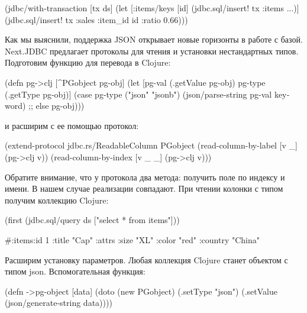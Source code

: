 \begin{english}
  \begin{clojure}
(jdbc/with-transaction [tx ds]
  (let [{:items/keys [id]}
        (jdbc.sql/insert! tx :items {...})]
    (jdbc.sql/insert! tx :sales {:item_id id :ratio 0.66})))
  \end{clojure}
\end{english}

Как мы выяснили, поддержка JSON открывает новые горизонты в работе с базой. Next.JDBC предлагает протоколы для чтения и установки нестандартных типов. Подготовим функцию для перевода  в Clojure:

\begin{english}
  \begin{clojure}
(defn pg->clj [^PGobject pg-obj]
  (let [pg-val (.getValue pg-obj)
        pg-type (.getType pg-obj)]
    (case pg-type
      ("json" "jsonb")
      (json/parse-string pg-val keyword)
      ;; else
      pg-obj)))
  \end{clojure}
\end{english}

и расширим с ее помощью протокол:

\begin{english}
  \begin{clojure}
(extend-protocol jdbc.rs/ReadableColumn
  PGobject
  (read-column-by-label [v _]
    (pg->clj v))
  (read-column-by-index [v _ _]
    (pg->clj v)))
  \end{clojure}
\end{english}

Обратите внимание, что у протокола два метода: получить поле по индексу и имени. В нашем случае реализации совпадают. При чтении колонки с типом  получим коллекцию Clojure:

\begin{english}
  \begin{clojure}
(first (jdbc.sql/query ds ["select * from items"]))

#:items{:id 1
        :title "Cap"
        :attrs {:size "XL" :color "red" :country "China"}}
  \end{clojure}
\end{english}

Расширим установку параметров. Любая коллекция Clojure станет объектом  с типом json. Вспомогательная функция:

\begin{english}
  \begin{clojure}
(defn ->pg-object [data]
  (doto (new PGobject)
    (.setType "json")
    (.setValue (json/generate-string data))))
  \end{clojure}
\end{english}

